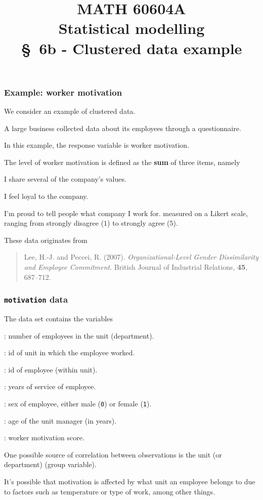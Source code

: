 \documentclass{beamer}
\title[\color{white}{MATH 60604A \S~6b - Clustered data example}]{\texorpdfstring{MATH 60604A \\Statistical modelling \\ \S~6b - Clustered data example}{MATH 60604A \\Statistical modelling \\ \S~6b - Clustered data example}}
\author{}
\institute{HEC Montréal\\
Department of Decision Sciences}
\date{}
\begin{document}
\frame{\titlepage}

\begin{frame}[fragile]
\frametitle{Example: worker motivation}
We consider an example of clustered data.
\bi
\item  A large business collected data about its employees through a questionnaire. 
\item In this example, the response variable is \alert{worker motivation}. 
\item The level of worker motivation is defined as the \textbf{sum} of three items, namely
\bi

\item I share several of the company's values.
\item I feel loyal to the company.
\item I'm proud to tell people what company I work for.
\ei
measured on a Likert scale, ranging from strongly disagree ($1$) to strongly agree ($5$).
\item These data originates from

\begin{quote}
Lee, H.-J. and Peccei, R. (2007). \textsl{Organizational-Level Gender Dissimilarity and
Employee Commitment}. British Journal of Industrial Relations, \textbf{45}, 687--712.
\end{quote}
\ei
\end{frame}

\begin{frame}[fragile]
\frametitle{\texttt{motivation} data}
 The  data set contains the variables%
\bi

\item {}: number of employees in the unit (department).
\item {}: id of unit in which the employee worked.
\item  {}: id of employee (within unit).
\item {}: years of service of employee.
\item {}: sex of employee, either male (\texttt{0}) or female (\texttt{1}).
\item  {}: age of the unit manager (in years).
\item {}: worker motivation score.
\ei

\bi
\item  One possible source of correlation between observations is the \alert{unit (or department)} (group variable). 
\item It's possible that motivation is affected by what unit an employee belongs to due to factors such as temperature or type of work, among other things.
\ei
\end{frame}
\end{document}
